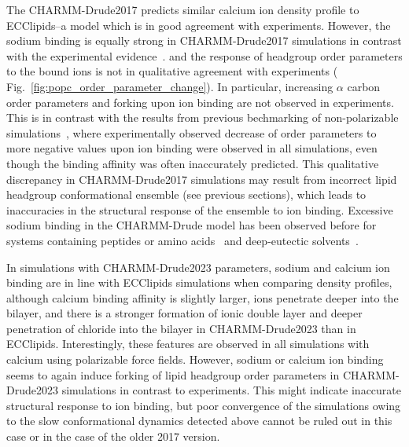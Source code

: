 \documentclass[journal=jctcce,manuscript=article,layout=singlecolumn]{achemso}
\begin{document}
The CHARMM-Drude2017 predicts similar calcium ion density profile to ECClipids--a model which is in good agreement with experiments. However, the sodium binding is equally strong in CHARMM-Drude2017 simulations in contrast with the experimental evidence~\cite{Catte2016}. 
and the response of headgroup order parameters to the bound ions is not in qualitative agreement with experiments ( Fig.~\ref{fig:popc_order_parameter_change}). In particular, increasing $\alpha$ carbon order parameters and forking upon ion binding are not observed in experiments. This is in contrast with the results from previous bechmarking of non-polarizable simulations~\cite{Catte2016}, where experimentally observed decrease of order parameters to more negative values upon ion binding were observed in all simulations, even though the binding affinity was often inaccurately predicted. This qualitative discrepancy in CHARMM-Drude2017 simulations may result from incorrect lipid headgroup conformational ensemble (see previous sections), which leads to inaccuracies in the structural response of the ensemble to ion binding. 
Excessive sodium binding in the CHARMM-Drude model has been observed before for systems containing peptides or amino acids~\cite{Ngo2019, Kav2022} and deep-eutectic solvents~\cite{shayestehpour2022ion}. %

In simulations with CHARMM-Drude2023 parameters, sodium and calcium ion binding are in line with ECClipids simulations when comparing density profiles, although calcium binding affinity is slightly larger, ions penetrate deeper into the bilayer, and there is a stronger formation of ionic double layer and deeper penetration of chloride into the bilayer in CHARMM-Drude2023 than in ECClipids. Interestingly, these features are observed in all simulations with calcium using polarizable force fields. 
However, sodium or calcium ion binding seems to again induce forking of lipid headgroup order parameters in CHARMM-Drude2023 simulations in contrast to experiments. 
This might indicate inaccurate structural response to ion binding, but poor convergence of the simulations owing to the slow conformational dynamics detected above cannot be ruled out in this case or in the case of the older 2017 version.
%
\end{document}
